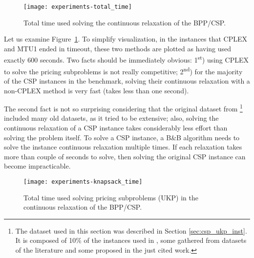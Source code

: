 
\begin{figure}[h]
\caption{Total time used solving the continuous relaxation of the BPP/CSP.}
\begin{center}
\texttt{[image: experiments-total\_time]}
\end{center}
\label{fig:csp_total_time}
\end{figure}

Let us examine Figure~\ref{fig:csp_total_time}.
To simplify visualization, in the instances that CPLEX and MTU1 ended in timeout, these two methods are plotted as having used exactly 600 seconds.
Two facts should be immediately obvious: 1\textsuperscript{st}) using CPLEX to solve the pricing subproblems is not really competitive; 2\textsuperscript{nd}) for the majority of the CSP instances in the benchmark, solving their continuous relaxation with a non-CPLEX method is very fast (takes less than one second).

The second fact is not so surprising considering that the original dataset from \cite{survey2014}\footnote{The dataset used in this section was described in Section \ref{sec:csp_ukp_inst}. It is composed of 10\% of the instances used in \cite{survey2014}, some gathered from datasets of the literature and some proposed in the just cited work.} included many old datasets, as it tried to be extensive; also, solving the continuous relaxation of a CSP instance takes considerably less effort than solving the problem itself.
To solve a CSP instance, a B\&B algorithm needs to solve the instance continuous relaxation multiple times.
If each relaxation takes more than couple of seconds to solve, then solving the original CSP instance can become impracticable.

\begin{figure}[h]
\caption{Total time used solving pricing subproblems (UKP) in the continuous relaxation of the BPP/CSP.}
\begin{center}
\texttt{[image: experiments-knapsack\_time]}
\end{center}
\label{fig:csp_knapsack_time}
\end{figure}

